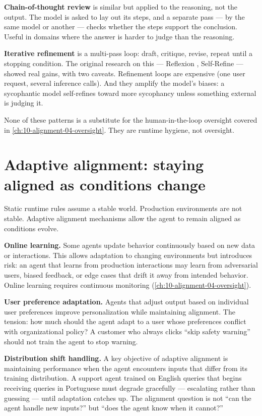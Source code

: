 \textbf{Chain-of-thought review} is similar but applied to the reasoning, not the output. The model is asked to lay out its steps, and a separate pass --- by the same model or another --- checks whether the steps support the conclusion. Useful in domains where the answer is harder to judge than the reasoning.

\textbf{Iterative refinement} is a multi-pass loop: draft, critique, revise, repeat until a stopping condition. The original research on this --- Reflexion \citep{shinn2023reflexion}, Self-Refine \citep{madaan2023selfrefine} --- showed real gains, with two caveats. Refinement loops are expensive (one user request, several inference calls). And they amplify the model's biases: a sycophantic model self-refines toward more sycophancy unless something external is judging it.

None of these patterns is a substitute for the human-in-the-loop oversight covered in \autoref{ch:10-alignment-04-oversight}. They are runtime hygiene, not oversight.

\section{Adaptive alignment: staying aligned as conditions change}

Static runtime rules assume a stable world. Production environments are not stable. Adaptive alignment mechanisms allow the agent to remain aligned as conditions evolve.

\textbf{Online learning.} Some agents update behavior continuously based on new data or interactions. This allows adaptation to changing environments but introduces risk: an agent that learns from production interactions may learn from adversarial users, biased feedback, or edge cases that drift it away from intended behavior. Online learning requires continuous monitoring (\autoref{ch:10-alignment-04-oversight}).

\textbf{User preference adaptation.} Agents that adjust output based on individual user preferences improve personalization while maintaining alignment. The tension: how much should the agent adapt to a user whose preferences conflict with organizational policy? A customer who always clicks ``skip safety warning'' should not train the agent to stop warning.

\textbf{Distribution shift handling.} A key objective of adaptive alignment is maintaining performance when the agent encounters inputs that differ from its training distribution. A support agent trained on English queries that begins receiving queries in Portuguese must degrade gracefully --- escalating rather than guessing --- until adaptation catches up. The alignment question is not ``can the agent handle new inputs?'' but ``does the agent know when it cannot?''

